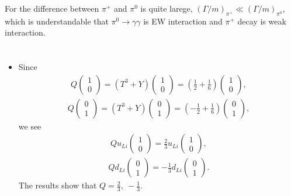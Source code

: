 \documentclass[11pt]{article}
\begin{document}
For the difference between $\pi^+$ and $\pi^0$ is quite larege, $(\Gamma/m)_{\pi^+} \ll (\Gamma/m)_{\pi^0}$, which is understandable that $\pi^0 \to \gamma \gamma$ is EW interaction and $\pi^+$ decay is weak interaction.

\section{ }

\begin{itemize}
  \item Since
  \begin{eqnarray}
  Q
  \begin{pmatrix}
    1\\0
  \end{pmatrix}
  =(T^3+Y)
  \begin{pmatrix}
    1\\0
  \end{pmatrix}
  =(\frac{1}{2}+\frac{1}{6})
  \begin{pmatrix}
    1\\0
  \end{pmatrix},
  \end{eqnarray}
  \begin{eqnarray}
    Q
    \begin{pmatrix}
      0\\1
    \end{pmatrix}
    =(T^3+Y)
    \begin{pmatrix}
      0\\1
    \end{pmatrix}
    =(-\frac{1}{2}+\frac{1}{6})
    \begin{pmatrix}
      0\\1
    \end{pmatrix},
    \end{eqnarray}
     we see
      \begin{eqnarray}
        Q u_{Li}
        \begin{pmatrix}
          1\\0
        \end{pmatrix}
        =\frac{2}{3} u_{Li}
        \begin{pmatrix}
          1\\0
        \end{pmatrix},
        \end{eqnarray}
        \begin{eqnarray}
          Q d_{Li}
          \begin{pmatrix}
            0\\1
          \end{pmatrix}
          =-\frac{1}{3} d_{Li}
          \begin{pmatrix}
            0\\1
          \end{pmatrix}.
          \end{eqnarray}
  The results show that $Q=\frac{2}{3},~-\frac{1}{3}$.


\end{itemize}
\end{document}
